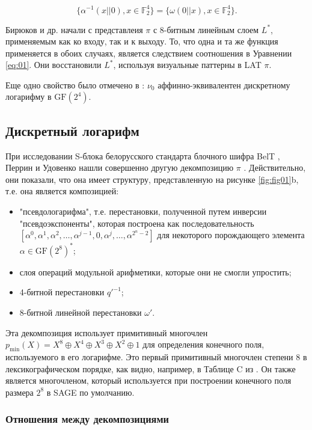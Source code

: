 \begin{equation}
\{\alpha^{-1}(x||0), x \in \mathbb{F}_2^4\} = \{\omega(0||x), x \in \mathbb{F}_2^4\}.
\label{eq:01}
\end{equation}

Бирюков и др. начали с представлеия \(\pi\) с 8-битным линейным слоем \(L^*\), применяемым как ко входу, так и к выходу. То, что одна и та же функция применяется в обоих случаях, является следствием соотношения в Уравнении \eqref{eq:01}. Они восстановили \(L^*\), используя визуальные паттерны в LAT \(\pi\).

Еще одно свойство было отмечено в \cite{PU16}: \(\nu_0\) аффинно-эквивалентен дискретному логарифму в \(\text{GF}(2^4)\).

\subsection{Дискретный логарифм}

При исследовании S-блока белорусского стандарта блочного шифра BelT \cite{Bel11}, Перрин и Удовенко нашли совершенно другую декомпозицию \(\pi\) \cite{PU16}. Действительно, они показали, что она имеет структуру, представленную на рисунке \ref{fig:fig01}b, т.е. она является композицией:

\begin{itemize}
    \item "псевдологарифма", т.е. перестановки, полученной путем инверсии "псевдоэкспоненты", которая построена как последовательность \([\alpha^0, \alpha^1, \alpha^2, \ldots, \alpha^{j-1}, 0, \alpha^j, \ldots, \alpha^{2^n-2}]\) для некоторого порождающего элемента \(\alpha \in \text{GF}(2^8)^*\);
    \item слоя операций модульной арифметики, которые они не смогли упростить;
    \item 4-битной перестановки \(q'^{-1}\);
    \item 8-битной линейной перестановки \(\omega'\).
\end{itemize}

Эта декомпозиция использует примитивный многочлен \(p_{\text{min}}(X) = X^8 \oplus X^4 \oplus X^3 \oplus X^2 \oplus 1\) для определения конечного поля, используемого в его логарифме. Это первый примитивный многочлен степени 8 в лексикографическом порядке, как видно, например, в Таблице C из \cite{LN97}. Он также является многочленом, который используется при построении конечного поля размера \(2^8\) в SAGE \cite{Dev17} по умолчанию.

\subsubsection{Отношения между декомпозициями}


